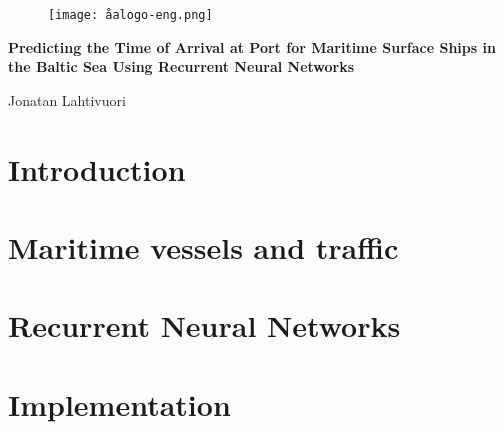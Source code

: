 \documentclass[12pt]{article}
\begin{document}
\begin{titlepage}
\vspace*{20mm}
\begin{figure}[h]
\centering
\texttt{[image: åalogo-eng.png]}
\end{figure}
\begin{center}
	\Huge\textbf{Predicting the Time of Arrival at Port for Maritime Surface Ships in the Baltic Sea Using Recurrent Neural Networks}
\end{center}
\vfill
\begin{flushright}
Jonatan Lahtivuori\\
\end{flushright}
\end{titlepage}




\newpage
\tableofcontents

\newpage
{} %
\section{Introduction}


\newpage
\section{Maritime vessels and traffic}


\newpage
\section{Recurrent Neural Networks}


\newpage
\section{Implementation}

\end{document}
